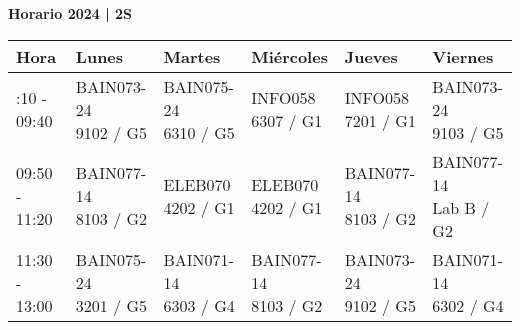 \documentclass[extrafontsizes, 20pt]{memoir}
\begin{document}
\centering
{\LARGE\textbf{Horario 2024 | 2S}}
\vfill
\vspace{10pt}

\begin{table}[!ht]
\centering
{}
\begin{tabular}{|>{\centering\arraybackslash}m{4.5cm}|*{5}{>{\centering\arraybackslash}m{4cm}|}}

\hline

\rowcolor[HTML]{20B2AA}
\textbf{Hora} & 
\textbf{Lunes} & 
\textbf{Martes} & 
\textbf{Miércoles} & 
\textbf{Jueves} & 
\textbf{Viernes} \\

\hline
08:10 - 09:40 & 
\parbox[m]{4cm}{\centering\small BAIN073-24\\ \footnotesize 9102 / G5} & %
\parbox[m]{4cm}{\centering\small BAIN075-24\\ \footnotesize 6310 / G5} & %
\parbox[m]{4cm}{\centering\small INFO058\\ \footnotesize 6307 / G1} & %
\parbox[m]{4cm}{\centering\small INFO058\\ \footnotesize 7201 / G1} & %
\parbox[m]{4cm}{\centering\small BAIN073-24\\ \footnotesize 9103 / G5} \\ %

\hline

09:50 - 11:20 & 
\parbox[m]{4cm}{\centering\small BAIN077-14\\ \footnotesize 8103 / G2} & %
\parbox[m]{4cm}{\centering\small ELEB070\\ \footnotesize 4202 / G1} & %
\parbox[m]{4cm}{\centering\small ELEB070\\ \footnotesize 4202 / G1} & %
\parbox[m]{4cm}{\centering\small BAIN077-14\\ \footnotesize 8103 / G2} & %
\parbox[m]{4cm}{\centering\small BAIN077-14\\ \footnotesize Lab B / G2} \\ %

\hline

11:30 - 13:00 & 
\parbox[m]{4cm}{\centering\small BAIN075-24\\ \footnotesize 3201 / G5} & %
\parbox[m]{4cm}{\centering\small BAIN071-14\\ \footnotesize 6303 / G4} & %
\parbox[m]{4cm}{\centering\small BAIN077-14\\ \footnotesize 8103 / G2} & %
\parbox[m]{4cm}{\centering\small BAIN073-24\\ \footnotesize 9102 / G5} & %
\parbox[m]{4cm}{\centering\small BAIN071-14\\ \footnotesize 6302 / G4} \\ %


\end{tabular}
\end{table}
\end{document}

